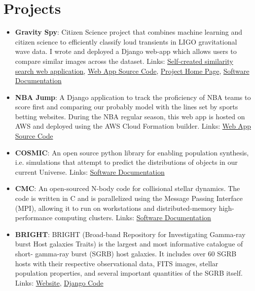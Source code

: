 \documentclass[a4paper,20pt]{article}
\newcommand{\resumeItem}[2]{
  \item\small{
    \textbf{#1}{: #2 \vspace{-2pt}}
  }
}
\newcommand{\resumeSubItem}[2]{\resumeItem{#1}{#2}\vspace{-3pt}}
\newcommand{\resumeSubHeadingListStart}{\begin{itemize}[leftmargin=*]}
\newcommand{\resumeSubHeadingListEnd}{\end{itemize}}
\begin{document}
\section{Projects}
\resumeSubHeadingListStart
\resumeSubItem{Gravity Spy}{Citizen Science project that combines machine learning and citizen science to efficiently classify loud transients in LIGO gravitational wave data. I wrote and deployed a Django web-app which allows users to compare similar images across the dataset. Links: \href{https://gravityspytools.ciera.northwestern.edu/}{Self-created similarity search web application}, \href{https://github.com/Gravity-Spy/gravityspytools/}{Web App Source Code}, \href{https://gravityspy.org/}{Project Home Page},  \href{https://gravity-spy.github.io/gravityspy-ligo-pipeline/}{Software Documentation}}
\vspace{2pt}
\resumeSubItem{NBA Jump}{A Django application to track the proficiency of NBA teams to score first and comparing our probably model with the lines set by sports betting websites. During the NBA regular season, this web app is hosted on AWS and deployed using the AWS Cloud Formation builder. Links: \href{https://github.com/scottcoughlin2014/nbajump}{Web App Source Code}}
\vspace{2pt}
\resumeSubItem{COSMIC}{An open source python library for enabling population synthesis, i.e. simulations that attempt to predict the distributions of objects in our current Universe. Links: \href{https://cosmic-popsynth.github.io/}{Software Documentation}}
\vspace{2pt}
\resumeSubItem{CMC}{An open-sourced N-body code for collisional stellar dynamics. The code is written in C and is parallelized using the Message Passing Interface (MPI), allowing it to run on workstations and distributed-memory high-performance computing clusters. Links: \href{https://clustermontecarlo.github.io/CMC-COSMIC/}{Software Documentation}}
\vspace{2pt}
\resumeSubItem{BRIGHT}{BRIGHT (Broad-band Repository for Investigating Gamma-ray burst Host galaxies Traits) is the largest and most informative catalogue of short- gamma-ray burst (SGRB) host galaxies. It includes over 60 SGRB hosts with their respective observational data, FITS images, stellar population properties, and several important quantities of the SGRB itself. Links: \href{https://bright.ciera.northwestern.edu/welcome/}{Website}, \href{https://github.com/CIERA-Transients/bright}{Django Code}}
\vspace{2pt}
\resumeSubHeadingListEnd
\vspace{-5pt}
\end{document}
